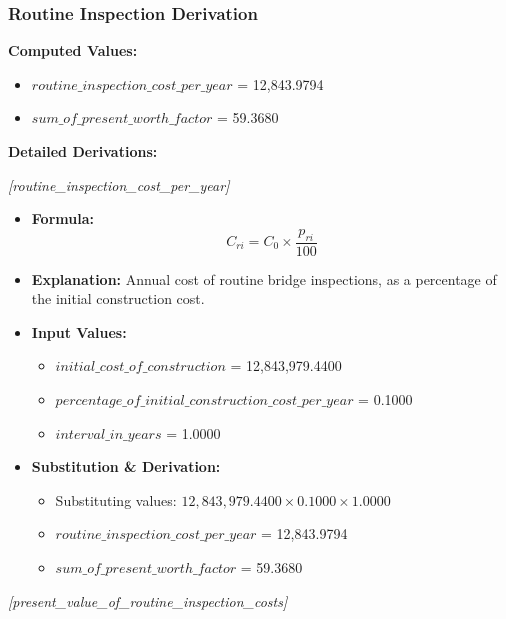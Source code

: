 \documentclass[12pt,a4paper]{article}
\begin{document}
\subsubsection{Routine Inspection Derivation}

\textbf{Computed Values:}

\begin{itemize}
  \item $routine\_inspection\_cost\_per\_year$ = 12,843.9794
  \item $sum\_of\_present\_worth\_factor$ = 59.3680
\end{itemize}

\textbf{Detailed Derivations:}


\textit{[routine\_inspection\_cost\_per\_year]}

\begin{itemize}
  \item \textbf{Formula:} $$C_{ri} = C_0 \times \frac{p_{ri}}{100}$$
  \item \textbf{Explanation:} Annual cost of routine bridge inspections, as a percentage of the initial construction cost.
  \item \textbf{Input Values:}
  \begin{itemize}
    \item $initial\_cost\_of\_construction$ = 12,843,979.4400
    \item $percentage\_of\_initial\_construction\_cost\_per\_year$ = 0.1000
    \item $interval\_in\_years$ = 1.0000
  \end{itemize}
  \item \textbf{Substitution \& Derivation:}
  \begin{itemize}
    \item Substituting values: $12,843,979.4400 \times 0.1000 \times 1.0000$
    \item $routine\_inspection\_cost\_per\_year$ = 12,843.9794
    \item $sum\_of\_present\_worth\_factor$ = 59.3680
  \end{itemize}
\end{itemize}


\textit{[present\_value\_of\_routine\_inspection\_costs]}
\end{document}

